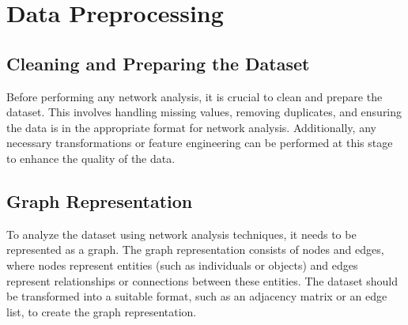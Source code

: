 \section{Data Preprocessing}

\subsection{Cleaning and Preparing the Dataset}

Before performing any network analysis, it is crucial to clean and prepare the dataset. This involves handling missing values, removing duplicates, and ensuring the data is in the appropriate format for network analysis. Additionally, any necessary transformations or feature engineering can be performed at this stage to enhance the quality of the data.

\subsection{Graph Representation}

To analyze the dataset using network analysis techniques, it needs to be represented as a graph. The graph representation consists of nodes and edges, where nodes represent entities (such as individuals or objects) and edges represent relationships or connections between these entities. The dataset should be transformed into a suitable format, such as an adjacency matrix or an edge list, to create the graph representation.

